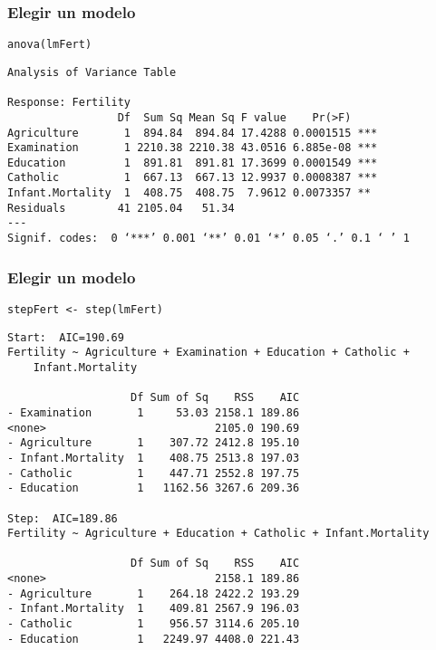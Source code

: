 \documentclass{beamer}
\begin{document}
\begin{frame}[fragile]
\frametitle{Elegir un modelo}
\label{sec-3-10}


\lstset{language=R}
\begin{lstlisting}
anova(lmFert)
\end{lstlisting}


\begin{verbatim}
Analysis of Variance Table

Response: Fertility
                 Df  Sum Sq Mean Sq F value    Pr(>F)    
Agriculture       1  894.84  894.84 17.4288 0.0001515 ***
Examination       1 2210.38 2210.38 43.0516 6.885e-08 ***
Education         1  891.81  891.81 17.3699 0.0001549 ***
Catholic          1  667.13  667.13 12.9937 0.0008387 ***
Infant.Mortality  1  408.75  408.75  7.9612 0.0073357 ** 
Residuals        41 2105.04   51.34                      
---
Signif. codes:  0 ‘***’ 0.001 ‘**’ 0.01 ‘*’ 0.05 ‘.’ 0.1 ‘ ’ 1
\end{verbatim}
\end{frame}
\begin{frame}[fragile]
\frametitle{Elegir un modelo}
\label{sec-3-11}


\lstset{language=R}
\begin{lstlisting}
stepFert <- step(lmFert)
\end{lstlisting}


\begin{verbatim}
Start:  AIC=190.69
Fertility ~ Agriculture + Examination + Education + Catholic + 
    Infant.Mortality

                   Df Sum of Sq    RSS    AIC
- Examination       1     53.03 2158.1 189.86
<none>                          2105.0 190.69
- Agriculture       1    307.72 2412.8 195.10
- Infant.Mortality  1    408.75 2513.8 197.03
- Catholic          1    447.71 2552.8 197.75
- Education         1   1162.56 3267.6 209.36

Step:  AIC=189.86
Fertility ~ Agriculture + Education + Catholic + Infant.Mortality

                   Df Sum of Sq    RSS    AIC
<none>                          2158.1 189.86
- Agriculture       1    264.18 2422.2 193.29
- Infant.Mortality  1    409.81 2567.9 196.03
- Catholic          1    956.57 3114.6 205.10
- Education         1   2249.97 4408.0 221.43
\end{verbatim}
\end{frame}
\end{document}
